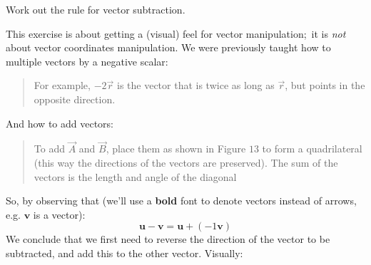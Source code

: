 \documentclass[solutions.tex]{subfiles}
\begin{document}
\maketitle
\begin{exercise} Work out the rule for vector subtraction.
\end{exercise}
This exercise is about getting a (visual) feel for vector
manipulation; it is \textit{not} about vector coordinates manipulation.
We were previously taught how to multiple vectors by a negative
scalar:
\begin{quote}
For example, $-2\vec{r}$ is the vector that is twice as long
as $\vec{r}$, but points in the opposite direction.
\end{quote}
And how to add vectors:
\begin{quote}
To add $\vec{A}$ and $\vec{B}$, place them as shown in Figure $13$
to form a quadrilateral (this way the directions of the vectors are
preserved). The sum of the vectors is the length and angle of the
diagonal
\end{quote}
So, by observing that (we'll use a \textbf{bold} font to denote
vectors instead of arrows, e.g. $\bm{v}$ is a vector):
\[
	\bm{u}-\bm{v} = \bm{u} + (-1\bm{v})
\]
We conclude that we first need to reverse the direction of the
vector to be subtracted, and add this to the other vector.
Visually:
\begin{figure}[H]
	\centering
\end{figure}
\end{document}
